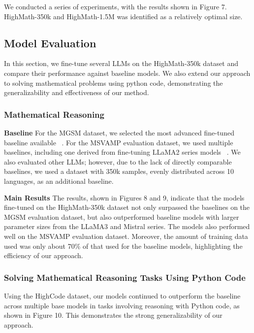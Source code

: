 \documentclass[11pt]{article}
\begin{document}
We conducted a series of experiments, with the results shown in Figure 7. HighMath-350k and HighMath-1.5M was identified as a relatively optimal size. 



\subsection{Model Evaluation}
In this section, we fine-tune several LLMs on the HighMath-350k dataset and compare their performance against baseline models. We also extend our approach to solving mathematical problems using python code, demonstrating the generalizability and effectiveness of our method.

\subsubsection{Mathematical Reasoning}

\textbf{Baseline} For the MGSM dataset, we selected the most advanced fine-tuned baseline available ~\citep{zhu2024question,zhu2024power}. For the MSVAMP evaluation dataset, we used multiple baselines, including one derived from fine-tuning LLaMA2 series models ~\citep{zhu2024question,zhu2024power}. We also evaluated other LLMs; however, due to the lack of directly comparable baselines, we used a dataset with 350k samples, evenly distributed across 10 languages, as an additional baseline.

\textbf{Main Results} 
The results, shown in Figures 8 and 9, indicate that the models fine-tuned on the HighMath-350k dataset not only surpassed the baselines on the MGSM evaluation dataset, but also outperformed baseline models with larger parameter sizes from the LLaMA3 and Mistral series. The models also performed well on the MSVAMP evaluation dataset. Moreover, the amount of training data used was only about 70\% of that used for the baseline models, highlighting the efficiency of our approach.

\subsubsection{Solving Mathematical Reasoning Tasks Using Python Code}
Using the HighCode dataset, our models continued to outperform the baseline ~\citep{zhu2024power} across multiple base models in tasks involving reasoning with Python code, as shown in Figure 10. This demonstrates the strong generalizability of our approach.
\end{document}
